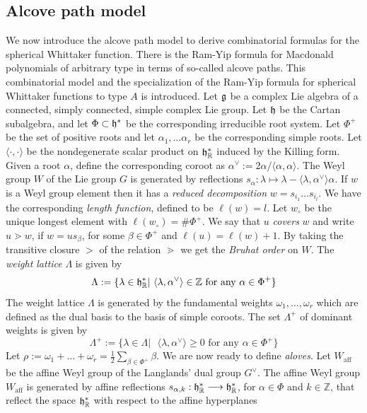 \documentclass[11pt]{amsart}
\begin{document}
{\subsection{Alcove path model}
We now introduce the alcove path model to derive combinatorial formulas for the spherical Whittaker function. There is the Ram-Yip formula for Macdonald polynomials of arbitrary type in terms of so-called alcove paths. This combinatorial model and the specialization of the Ram-Yip formula for spherical Whittaker functions to type $A$ is introduced. %
\newline\indent Let $\frak{g}$ be a complex Lie algebra of a connected, simply connected, simple complex Lie group. Let $\frak{h}$ be the Cartan subalgebra, and let $\Phi \subset \frak{h}^{*}$ be the corresponding irreducible root system. Let $\Phi^{+}$ be the set of positive roots and let $\alpha_{1},\ldots \alpha_{r}$ be the corresponding simple roots. Let $\langle\cdot,\cdot\rangle$ be the nondegenerate scalar product on $\frak{h}^{*}_{\mathbb{R}}$ induced by the Killing form. Given a root $\alpha$, define the corresponding coroot as $\alpha^{\vee}:=2\alpha/\langle\alpha,\alpha\rangle$. The Weyl group $W$ of the Lie group $G$ is generated by reflections $s_{\alpha}:\lambda\mapsto\lambda-\langle\lambda,\alpha^{\vee}\rangle\alpha$. If $w$ is a Weyl group element then it has a \emph{reduced decomposition} $w=s_{i_{1}}\ldots s_{i_{l}}$. We have the corresponding \emph{length function}, defined to be $\ell(w)=l$. Let $w_{\circ}$ be the unique longest element with $\ell(w_{\circ})=\#\Phi^{+}$. We say that $u$ \emph{covers} $w$ and write $u\gtrdot w$, if $w=us_{\beta}$, for some $\beta\in \Phi^{+}$ and $\ell(u)=\ell(w)+1$. By taking the transitive closure $>$ of the relation $\gtrdot$ we get the \emph{Bruhat order} on $W$. 
\newline \indent The \emph{weight lattice} $\Lambda$ is given by 
\[
\Lambda:=\{\lambda\in\frak{h}^{*}_{\mathbb{R}}| \text{ } \langle\lambda,\alpha^{\vee}\rangle\in \mathbb{Z} \text{ for any } \alpha \in \Phi^{+}\}
\] 
The weight lattice $\Lambda$ is generated by the fundamental weights $\omega_{1}, \ldots, \omega_{r}$ which are defined as the dual basis to the basis of simple coroots. The set $\Lambda^{+}$ of dominant weights is given by 
\[
\Lambda^{+}:=\{\lambda\in\Lambda| \text{ } \langle\lambda,\alpha^{\vee}\rangle\geq 0\text{ for any } \alpha \in \Phi^{+}\}
\]
Let $\rho:=\omega_{1}+\ldots+\omega_{r}=\frac{1}{2}\sum_{\beta\in\Phi^{+}}\beta$. 
\newline\indent We are now ready to define \emph{aloves}. Let $W_{\text{aff}}$ be the affine Weyl group of the Langlands' dual group $G^{\vee}$. The affine Weyl group $W_{\text{aff}}$ is generated by affine reflections $s_{\alpha,k}:\frak{h}^{*}_{\mathbb{R}}\longrightarrow \frak{h}^{*}_{\mathbb{R}}$, for $\alpha \in \Phi$ and $k\in\mathbb{Z}$, that reflect the space $\frak{h}^{*}_{\mathbb{R}}$ with respect to the affine hyperplanes 
}
\end{document}

